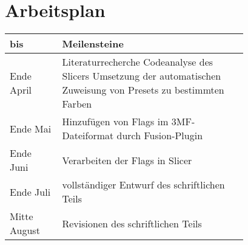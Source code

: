 \chapter{Arbeitsplan}\label{ch:method}

\renewcommand{\arraystretch}{2}
\begin{tabular}{l | p{0.78\linewidth}}
    \textbf{bis} & \textbf{Meilensteine} \\
    \hline 
    Ende April & Literaturrecherche \newline 
        Codeanalyse des Slicers \newline 
        Umsetzung der automatischen Zuweisung von Presets zu bestimmten Farben \\
    Ende Mai & Hinzuf\"ugen von Flags im 3MF-Dateiformat durch Fusion-Plugin \\
    Ende Juni & Verarbeiten der Flags in Slicer \\
    Ende Juli & vollst\"andiger Entwurf des schriftlichen Teils \\
    Mitte August & Revisionen des schriftlichen Teils
\end{tabular}

